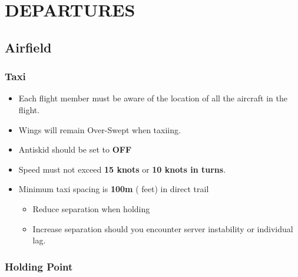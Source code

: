 \section{DEPARTURES}

\subsection{Airfield}

\subsubsection{Taxi}

\begin{itemize}

  \item Each flight member must be aware of the location of all the aircraft in
    the flight.

  \item Wings will remain Over-Swept when taxiing.

  \item Antiskid should be set to \textbf{OFF}

  \item Speed must not exceed \textbf{15 knots} or \textbf{10 knots in turns}.

  \item Minimum taxi spacing is \textbf{100m} ( feet) in direct
  trail

  \begin{itemize}
    \item Reduce separation when holding

    \item Increase separation should you encounter server instability or
      individual lag.
  \end{itemize}

\end{itemize}

\subsubsection{Holding Point}

